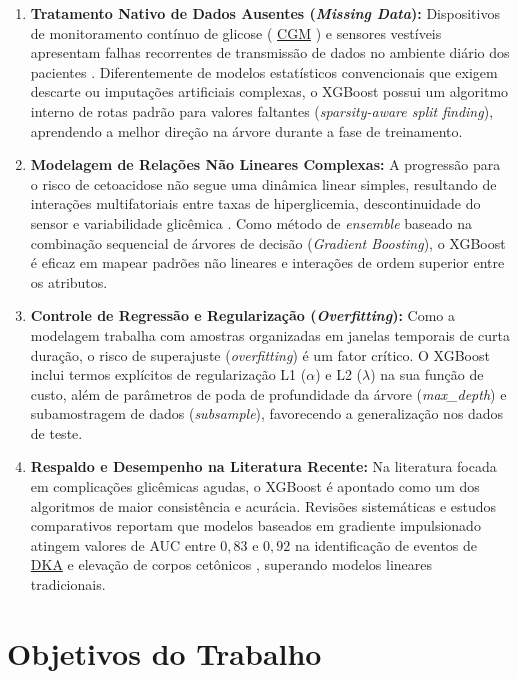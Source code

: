 \documentclass[12pt,a4paper]{article}
\DeclareRobustCommand{\sigla}[1]{%
    \texorpdfstring{\hyperlink{sigla:#1}{#1}}{#1}%
}
\begin{document}
\begin{enumerate}
\item \textbf{Tratamento Nativo de Dados Ausentes (\textit{Missing Data}):}
Dispositivos de monitoramento contínuo de glicose (\sigla{CGM}) e sensores
vestíveis apresentam falhas recorrentes de transmissão de dados no ambiente
diário dos pacientes \cite{alsamhori2025}. Diferentemente de modelos
estatísticos convencionais que exigem descarte ou imputações artificiais
complexas, o XGBoost possui um algoritmo interno de rotas padrão para valores
faltantes (\textit{sparsity-aware split finding}), aprendendo a melhor direção
na árvore durante a fase de treinamento.

\item \textbf{Modelagem de Relações Não Lineares Complexas:} A progressão para
o risco de cetoacidose não segue uma dinâmica linear simples, resultando de
interações multifatoriais entre taxas de hiperglicemia, descontinuidade do
sensor e variabilidade glicêmica \cite{cichosz2025}. Como método de
\textit{ensemble} baseado na combinação sequencial de árvores de decisão
(\textit{Gradient Boosting}), o XGBoost é eficaz em mapear padrões não lineares
e interações de ordem superior entre os atributos.

\item \textbf{Controle de Regressão e Regularização (\textit{Overfitting}):}
Como a modelagem trabalha com amostras organizadas em janelas temporais de
curta duração, o risco de superajuste (\textit{overfitting}) é um fator
crítico. O XGBoost inclui termos explícitos de regularização L1 ($\alpha$) e
L2 ($\lambda$) na sua função de custo, além de parâmetros de poda de
profundidade da árvore (\textit{max\_depth}) e subamostragem de dados
(\textit{subsample}), favorecendo a generalização nos dados de teste.

\item \textbf{Respaldo e Desempenho na Literatura Recente:} Na literatura
focada em complicações glicêmicas agudas, o XGBoost é apontado como um dos
algoritmos de maior consistência e acurácia. Revisões sistemáticas e estudos
comparativos reportam que modelos baseados em gradiente impulsionado atingem
valores de AUC entre $0{,}83$ e $0{,}92$ na identificação de eventos de
\sigla{DKA} e elevação de corpos cetônicos
\cite{alsamhori2025,cichosz2025}, superando modelos lineares tradicionais.
\end{enumerate}


\section{Objetivos do Trabalho}
\end{document}
